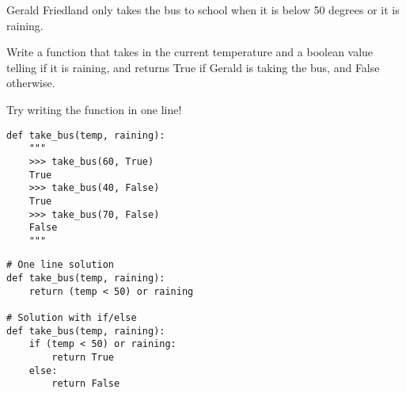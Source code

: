 \begin{blocksection}
\question Gerald Friedland only takes the bus to school when it is below 50 degrees or it is raining.

Write a function that takes in the current temperature and a boolean value telling if it is raining, and returns True if Gerald is taking the bus, and False otherwise.

Try writing the function in one line!

\begin{lstlisting}
def take_bus(temp, raining): 
    """
    >>> take_bus(60, True)
    True
    >>> take_bus(40, False)
    True
    >>> take_bus(70, False)
    False
    """

\end{lstlisting}

\begin{solution}[1.5in]
\begin{lstlisting}
# One line solution
def take_bus(temp, raining):
    return (temp < 50) or raining

# Solution with if/else
def take_bus(temp, raining):
    if (temp < 50) or raining:
    	return True
    else:
    	return False
\end{lstlisting}
\end{solution}
\end{blocksection}
